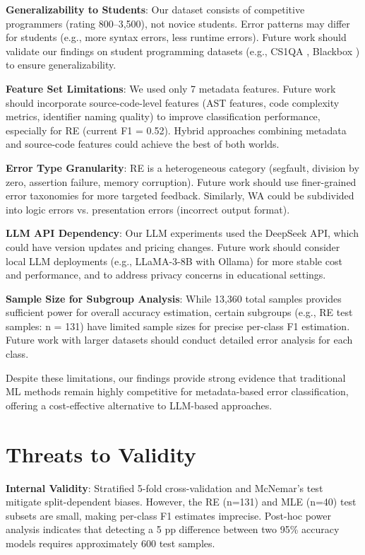 \documentclass[10pt,a4paper]{article}
\begin{document}
\textbf{Generalizability to Students}: Our dataset consists of competitive
programmers (rating 800--3,500), not novice students. Error patterns may
differ for students (e.g., more syntax errors, less runtime errors). Future
work should validate our findings on student programming datasets (e.g., CS1QA
\cite{lee2022cs1qa}, Blackbox \cite{bey2022analyzing}) to ensure generalizability.

\textbf{Feature Set Limitations}: We used only 7 metadata features. Future work
should incorporate source-code-level features (AST features, code complexity
metrics, identifier naming quality) to improve classification performance,
especially for RE (current F1 = 0.52). Hybrid approaches combining metadata
and source-code features could achieve the best of both worlds.

\textbf{Error Type Granularity}: RE is a heterogeneous category (segfault,
division by zero, assertion failure, memory corruption). Future work should
use finer-grained error taxonomies \cite{altadmri2015most} for more targeted
feedback. Similarly, WA could be subdivided into logic errors vs. presentation
errors (incorrect output format).

\textbf{LLM API Dependency}: Our LLM experiments used the DeepSeek API, which
could have version updates and pricing changes. Future work should consider local
LLM deployments (e.g., LLaMA-3-8B with Ollama) for more stable cost and
performance, and to address privacy concerns in educational settings.

\textbf{Sample Size for Subgroup Analysis}: While 13,360 total samples provides
sufficient power for overall accuracy estimation, certain subgroups (e.g., RE
test samples: n = 131) have limited sample sizes for precise per-class F1
estimation. Future work with larger datasets should conduct detailed error analysis
for each class.

Despite these limitations, our findings provide strong evidence that traditional
ML methods remain highly competitive for metadata-based error classification,
offering a cost-effective alternative to LLM-based approaches.

\section{Threats to Validity}

\textbf{Internal Validity}: Stratified 5-fold cross-validation and McNemar's test mitigate split-dependent biases. However, the RE (n=131) and MLE (n=40) test subsets are small, making per-class F1 estimates imprecise. Post-hoc power analysis indicates that detecting a 5 pp difference between two 95\% accuracy models requires approximately 600 test samples.
\end{document}
